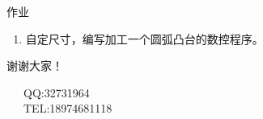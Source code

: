 \documentclass[UTF8,zihao=-4]{ctexbeamer}
\begin{document}
\begin{frame}{作业}
\begin{enumerate}
    \item 自定尺寸，编写加工一个圆弧凸台的数控程序。
\end{enumerate}
\end{frame}

\begin{frame}[plain]
\vfill

\centering \huge 谢谢大家！

\vfill

\flushleft \footnotesize   
~~~QQ:32731964\\
~~~TEL:18974681118\\

\end{frame}
\end{document}
